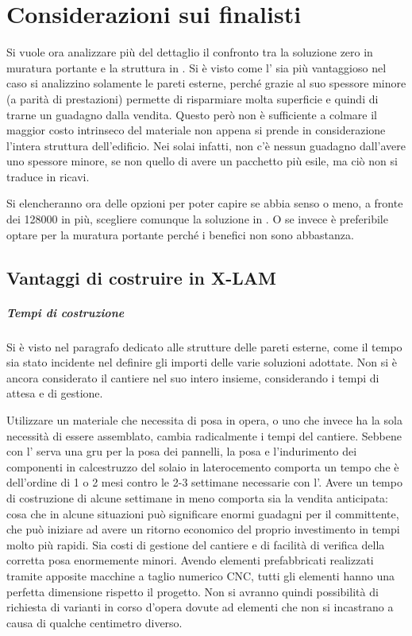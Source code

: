 \chapter{Considerazioni sui finalisti}
Si vuole ora analizzare più del dettaglio il confronto tra la soluzione zero in muratura portante e la struttura in \xlam. 
Si è visto come l'\xlam{} sia più vantaggioso nel caso si analizzino solamente le pareti esterne, perché grazie al suo spessore minore (a parità di prestazioni) permette di risparmiare molta superficie e quindi di trarne un guadagno dalla vendita.
Questo però non è sufficiente a colmare il maggior costo intrinseco del materiale non appena si prende in considerazione l'intera struttura dell'edificio. 
Nei solai infatti, non c'è nessun guadagno dall'avere uno spessore minore, se non quello di avere un pacchetto più esile, ma ciò non si traduce in ricavi.

Si elencheranno ora delle opzioni per poter capire se abbia senso o meno, a fronte dei \SI{128000}{\teuro} in più, scegliere comunque la soluzione in \xlam. 
O se invece è preferibile optare per la muratura portante perché i benefici non sono abbastanza.
\section{Vantaggi di costruire in X-LAM}
\paragraph{Tempi di costruzione}
Si è visto nel paragrafo dedicato alle strutture delle pareti esterne, come il tempo sia stato incidente nel definire gli importi delle varie soluzioni adottate.
Non si è ancora considerato il cantiere nel suo intero insieme, considerando i tempi di attesa e di gestione.

Utilizzare un materiale che necessita di posa in opera, o uno che invece ha la sola necessità di essere assemblato, cambia radicalmente i tempi del cantiere.
Sebbene con l'\xlam{} serva una gru per la posa dei pannelli, la posa e l'indurimento dei componenti in calcestruzzo del solaio in laterocemento comporta un tempo che è dell'ordine di 1 o 2 mesi contro le 2-3 settimane necessarie con l'\xlam. 
Avere un tempo di costruzione di alcune settimane in meno comporta sia la vendita anticipata: cosa che in alcune situazioni può significare enormi guadagni per il committente, che può iniziare ad avere un ritorno economico del proprio investimento in tempi molto più rapidi.
Sia costi di gestione del cantiere e di facilità di verifica della corretta posa enormemente minori. Avendo elementi prefabbricati realizzati tramite apposite macchine a taglio numerico CNC, tutti gli elementi hanno una perfetta dimensione rispetto il progetto. Non si avranno quindi possibilità di richiesta di varianti in corso d'opera dovute ad elementi che non si incastrano a causa di qualche centimetro diverso.

